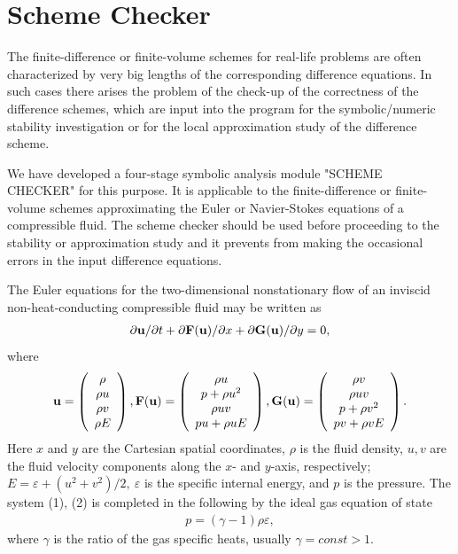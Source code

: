 \section{Scheme Checker}
\hspace{6mm}

   The finite-difference or finite-volume schemes for real-life problems are
often characterized by very big lengths of the corresponding difference
equations. In such cases there arises the problem of the check-up of the
correctness of the difference schemes, which are input into the program for
the symbolic/numeric stability investigation or for the local approximation
study of the difference scheme.

   We have developed a four-stage symbolic analysis module "SCHEME CHEC\-K\-ER"
for this purpose. It is applicable to the finite-difference or finite-volume
schemes approximating the Euler or Navier-Stokes equations of a compressible
fluid. The scheme checker should be used before proceeding to the stability
or approximation study and it prevents from making the occasional errors
in the input difference equations.

    The Euler equations for the
two-dimensional nonstationary flow of an inviscid non-heat-conducting
compressible fluid may be written as
\begin{eqnarray}
\partial{\bf u}/\partial t + \partial {\bf F}({\bf u})/\partial x +
\partial {\bf G}({\bf u})/\partial y=0,
\end{eqnarray}
where
\begin{eqnarray}
{\bf u}=\left( \begin{array}{c}
\rho \\
\rho u\\
\rho v\\
\rho E
\end{array} \right ),
{\bf F}({\bf u})=\left( \begin{array}{c}
\rho u\\
p+\rho u^{2}\\
\rho uv\\
pu+\rho uE
\end{array} \right ),
{\bf G}({\bf u})=\left( \begin{array}{c}
\rho v\\
\rho uv\\
p+\rho v^{2}\\
pv+\rho vE
\end{array} \right ).
\end{eqnarray}
Here $x$ and $y$ are the Cartesian spatial coordinates, $\rho $ is the fluid
density, $u,v$ are the fluid velocity
components along the  $x$- and $y$-axis, respectively;
$E=\varepsilon+(u^{2}+v^{2})/2,~ \varepsilon$ is the specific
internal energy, and $p$ is the pressure. The system (1), (2)
is completed in the following by the ideal gas equation of state
\begin{eqnarray}
p=(\gamma-1)\rho\varepsilon,
\end{eqnarray}
where $\gamma$ is the ratio of the gas specific heats,
usually $\gamma=const > 1$.

